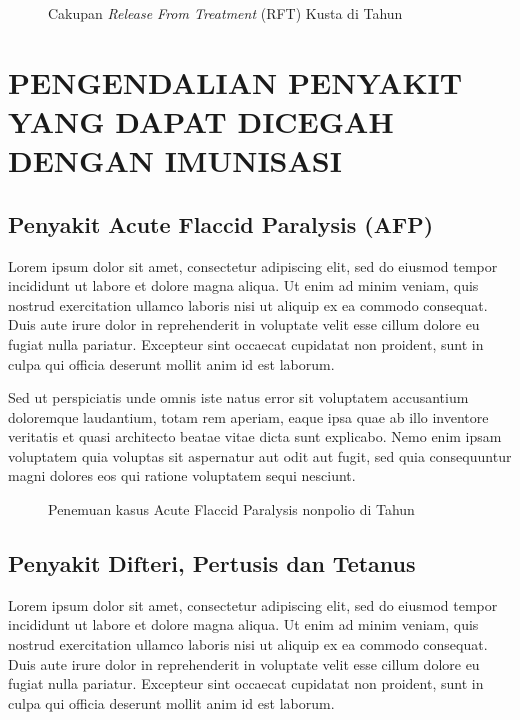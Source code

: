 \begin{figure}[H]
	\centering
	\caption{Cakupan \emph{Release From Treatment} (RFT) Kusta di \namaKabupaten Tahun \tP}
	\label{fig:Cakupan-RFT-Kusta}
\end{figure}

\section[PENGENDALIAN PD3I]{PENGENDALIAN PENYAKIT YANG DAPAT DICEGAH DENGAN IMUNISASI}
\subsection{Penyakit Acute Flaccid Paralysis (AFP)}
Lorem ipsum dolor sit amet, consectetur adipiscing elit, sed do eiusmod tempor incididunt ut labore et dolore magna aliqua. Ut enim ad minim veniam, quis nostrud exercitation ullamco laboris nisi ut aliquip ex ea commodo consequat. Duis aute irure dolor in reprehenderit in voluptate velit esse cillum dolore eu fugiat nulla pariatur. Excepteur sint occaecat cupidatat non proident, sunt in culpa qui officia deserunt mollit anim id est laborum.

Sed ut perspiciatis unde omnis iste natus error sit voluptatem accusantium doloremque laudantium, totam rem aperiam, eaque ipsa quae ab illo inventore veritatis et quasi architecto beatae vitae dicta sunt explicabo. Nemo enim ipsam voluptatem quia voluptas sit aspernatur aut odit aut fugit, sed quia consequuntur magni dolores eos qui ratione voluptatem sequi nesciunt.

\begin{figure}[H]
  \centering
  \caption{Penemuan kasus Acute Flaccid Paralysis nonpolio di \namaKabupaten Tahun \tP}
  \label{fig:Jumlah-AFP}
\end{figure}

\subsection{Penyakit Difteri, Pertusis dan Tetanus}
Lorem ipsum dolor sit amet, consectetur adipiscing elit, sed do eiusmod tempor incididunt ut labore et dolore magna aliqua. Ut enim ad minim veniam, quis nostrud exercitation ullamco laboris nisi ut aliquip ex ea commodo consequat. Duis aute irure dolor in reprehenderit in voluptate velit esse cillum dolore eu fugiat nulla pariatur. Excepteur sint occaecat cupidatat non proident, sunt in culpa qui officia deserunt mollit anim id est laborum.

